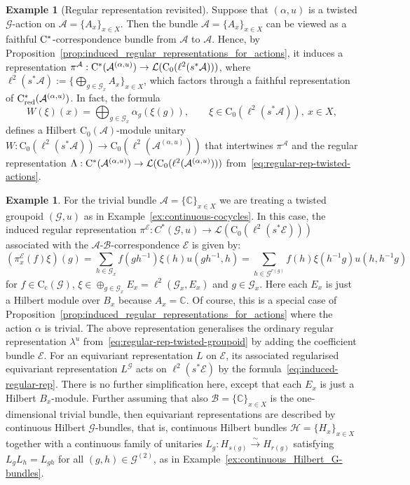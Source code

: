 \documentclass[11 pt, leqno]{amsart}
\numberwithin{equation}{section}
\theoremstyle{plain}
\theoremstyle{definition}
\newtheorem{ex}[thm]{Example}
\newcommand*{\congto}{\xrightarrow\sim}
\newcommand*{\contc}{\mathrm{C_c}}%
\newcommand*{\contz}{\mathrm{C_0}}%
\DeclareMathOperator{\red}{red}%
\renewcommand{\H}{\mathcal H}
\newcommand{\B}{\mathcal B}
\newcommand{\LL}{\mathcal L}
\newcommand{\G}{\mathcal G} %
\newcommand{\EE}{\mathcal E}
\newcommand{\A}{\mathcal A}
\newcommand{\C}{\mathbb C}
\newcommand{\cst}{\ifmmode\mathrm{C}^*\else{$\mathrm{C}^*$}\fi}
\newcommand*{\bcomment}[1]{{\color{blue}#1}}
\begin{document}
\begin{ex}[Regular representation revisited] \label{ex:regular_rep_revisited}
Suppose that $(\alpha, u)$ is a twisted $\G$-action on $\A = \{A_x\}_{x\in X}$. 
Then the bundle $\A=\{A_x\}_{x\in X}$ can be viewed as a faithful $\cst$-correspondence bundle from $\A$ to $\A$.
Hence, by Proposition~\ref{prop:induced_regular_representations_for_actions}, it induces a representation $\pi^{\A}:\cst(\A^{(\alpha,u)})\to \LL(\contz(\ell^2(s^*\A)))$, where $\ell^2(s^*\A):=\{\bigoplus_{g \in \G_x} A_x\}_{x\in X}$, which factors through a faithful representation of $\cst_{\red}(\A^{(\alpha,u)})$. 
In fact, the formula
\[
	W(\xi)(x) = \bigoplus_{g\in \G_x } \alpha_g(\xi(g)), \qquad  \xi\in \contz(\ell^2(s^*\A)),\ x \in X,
\]
defines a Hilbert $\contz(\A)$-module unitary $W:\contz(\ell^2(s^*\A))\to \contz(\ell^2(\A^{(\alpha, u)}))$ that intertwines $\pi^{\A}$ and the regular representation $\Lambda : \cst(\A^{(\alpha,u)}) \to \LL(\contz(\ell^2(\A^{(\alpha, u)})))$ from~\eqref{eq:regular-rep-twisted-actions}. 
%
\end{ex}

\begin{ex} \label{ex:groupoid regular}
For the trivial bundle $\A=\{\C\}_{x\in X}$ we are treating a twisted groupoid $(\G,u)$ as in Example~\ref{ex:continuous-cocycles}. 
In this case, the induced regular representation $\pi^\EE\colon C^*(\G,u)\to \LL(\contz(\ell^2(s^*\EE)))$ associated with the $\A$-$\B$-correspondence $\EE$ is given by: 
\[
    (\pi^\EE_x(f)\xi)(g) = \sum_{h\in \G_x}f(gh^{-1})\xi(h) u(gh^{-1},h) = \sum_{h\in \G^{r(g)}}f(h)\xi(h^{-1}g)u(h,h^{-1}g) 
\]
for $f\in \contc(\G)$, $\xi\in \oplus_{g\in \G_x} E_x=\ell^2(\G_x,E_x)$ and $g\in \G_x$. 
Here each $E_x$ is just a Hilbert module over $B_x$ because $A_x=\C$. 
Of course, this is a special case of Proposition~\ref{prop:induced_regular_representations_for_actions} where the action $\alpha$ is trivial. 
The above representation generalises the ordinary regular representation $\lambda^u$ from~\eqref{eq:regular-rep-twisted-groupoid} by adding the coefficient bundle $\EE$. 
For an equivariant representation $L$ on $\EE$, its associated regularised equivariant representation $L^\G$ acts on $\ell^2(s^*\EE)$ by the formula~\eqref{eq:induced-regular-rep}. 
There is no further simplification here, except that each $E_x$ is just a Hilbert $B_x$-module.
Further assuming that also $\B=\{\C\}_{x\in X}$ is the one-dimensional trivial bundle, then equivariant representations are described by continuous Hilbert $\G$-bundles, that is, continuous Hilbert bundles $\H=\{H_x\}_{x\in X}$ together with a continuous family of unitaries $L_g\colon H_{s(g)}\congto H_{r(g)}$ satisfying $L_gL_h=L_{gh}$ for all $(g,h)\in \G^{(2)}$, as in Example~\ref{ex:continuous_Hilbert_G-bundles}.
\end{ex}
\end{document}
